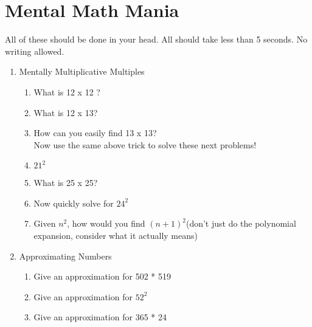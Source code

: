 \documentclass{article}
\begin{document}
\section{Mental Math Mania}
All of these should be done in your head. All should take less than 5 seconds. No writing allowed.
\begin{enumerate}
    \item Mentally Multiplicative Multiples\\
    
    \begin{enumerate}
        \item What is 12 x 12 ?
        \item What is 12 x 13?
        \item How can you easily find 13 x 13?\\
        Now use the same above trick to solve these next problems!
        \item $21^2$
        \item What is 25 x 25?
        \item Now quickly solve for $24^2$
        \item Given $n^2$, how would you find $(n+1)^2$(don't just do the polynomial expansion, consider what it actually means)
    \end{enumerate}
    
    \item Approximating Numbers
    \begin{enumerate}
        \item Give an approximation for 502 * 519
        \item Give an approximation for $52^2$
        \item Give an approximation for 365 * 24
    \end{enumerate}
    


\end{enumerate}
\end{document}

